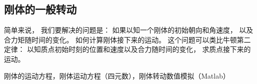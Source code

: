 

\begin{issues}
\issueDraft
\end{issues}


\subsection{刚体的一般转动}
简单来说， 我们要解决的问题是： 如果以知一个刚体的初始朝向和角速度， 以及合力矩随时间的变化。 如何计算刚体接下来的运动。 这个问题可以类比牛顿第二定律： 以知质点初始时刻的位置和速度以及合力随时间的变化， 求质点接下来的运动。

刚体的运动方程，刚体运动方程（四元数），刚体转动数值模拟（Matlab）